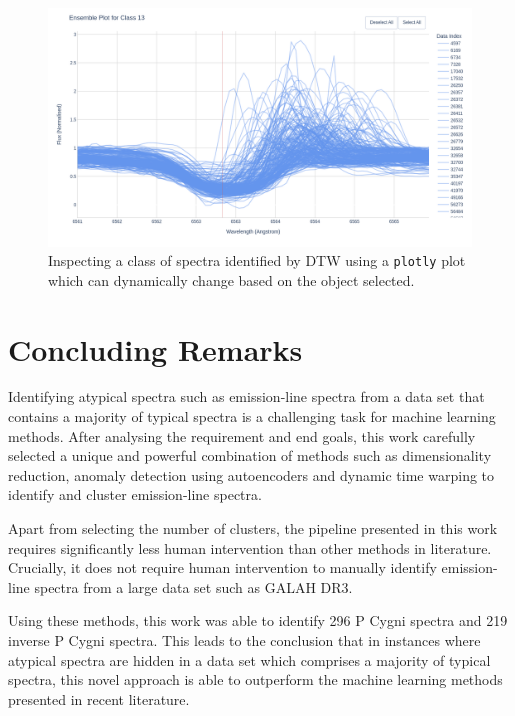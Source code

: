 \begin{figure}[!htb]
\centering
\includegraphics[scale=0.38]{figures/plotly image.png}
\caption{Inspecting a class of spectra identified by DTW using a \texttt{plotly} plot which can dynamically change based on the object selected.}
\end{figure}

\section{Concluding Remarks}

Identifying atypical spectra such as emission-line spectra from a data set that contains a majority of typical spectra is a challenging task for machine learning methods. After analysing the requirement and end goals, this work carefully selected a unique and powerful combination of methods such as dimensionality reduction, anomaly detection using autoencoders and dynamic time warping to identify and cluster emission-line spectra. 

Apart from selecting the number of clusters, the pipeline presented in this work requires significantly less human intervention than other methods in literature. Crucially, it does not require human intervention to manually identify emission-line spectra from a large data set such as GALAH DR3. 

Using these methods, this work was able to identify 296 P Cygni spectra and 219 inverse P Cygni spectra. This leads to the conclusion that in instances where atypical spectra are hidden in a data set which comprises a majority of typical spectra, this novel approach is able to outperform the machine learning methods presented in recent literature. 







